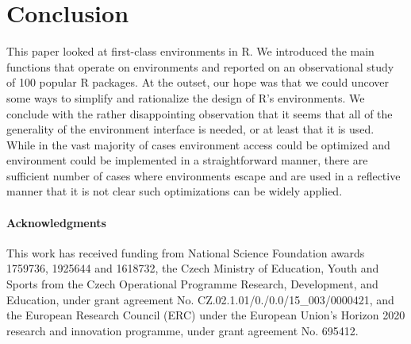 \documentclass[10pt,sigplan,authorversion=true]{acmart}
\renewcommand{\c}[1]{\lstinline |#1|\xspace}
\begin{document}


\section{Conclusion}

This paper looked at first-class environments in R. We introduced the main
functions that operate on environments and reported on an observational study of
100 popular R packages. At the outset, our hope was that we could uncover some
ways to simplify and rationalize the design of R's environments. We conclude
with the rather disappointing observation that it seems that all of the
generality of the environment interface is needed, or at least that it is used.
While in the vast majority of cases environment access could be optimized and
environment could be implemented in a straightforward manner, there are
sufficient number of cases where environments escape and are used in a
reflective manner that it is not clear such optimizations can be widely applied.
\newpage
\paragraph{Acknowledgments}
This work has received funding from National Science Foundation awards 1759736,
1925644 and 1618732, the Czech Ministry of Education, Youth and Sports from the
Czech Operational Programme Research, Development, and Education, under grant
agreement No. CZ.02.1.01/0./0.0/15\_003/0000421, and the European Research
Council (ERC) under the European Union’s Horizon 2020 research and innovation
programme, under grant agreement No. 695412.


\end{document}
